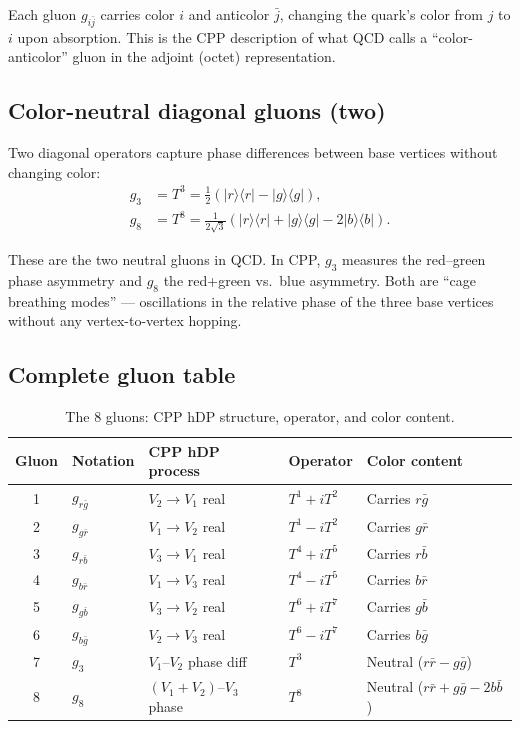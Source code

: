 \documentclass[11pt,a4paper]{article}
\newcommand{\ket}[1]{|#1\rangle}
\newcommand{\bra}[1]{\langle#1|}
\begin{document}
Each gluon $g_{i\bar{j}}$ carries color $i$ and anticolor $\bar{j}$,
changing the quark's color from $j$ to $i$ upon absorption.  This
is the CPP description of what QCD calls a ``color-anticolor'' gluon
in the adjoint (octet) representation.

\subsection{Color-neutral diagonal gluons (two)}

Two diagonal operators capture phase differences between base
vertices without changing color:
\begin{align}
g_3 &= T^3 = \frac{1}{2}(\ket{r}\!\bra{r} - \ket{g}\!\bra{g}),
\label{eq:g3} \\
g_8 &= T^8 = \frac{1}{2\sqrt{3}}
(\ket{r}\!\bra{r} + \ket{g}\!\bra{g} - 2\ket{b}\!\bra{b}).
\label{eq:g8}
\end{align}

These are the two neutral gluons in QCD.  In CPP, $g_3$ measures
the red--green phase asymmetry and $g_8$ the red+green vs.\ blue
asymmetry.  Both are ``cage breathing modes'' --- oscillations
in the relative phase of the three base vertices without any
vertex-to-vertex hopping.

\subsection{Complete gluon table}

\begin{table}[H]
\centering
\caption{The 8 gluons: CPP hDP structure, operator, and color content.}
\label{tab:gluons}
\begin{tabular}{@{}cllll@{}}
\toprule
Gluon & Notation & CPP hDP process & Operator & Color content \\
\midrule
1 & $g_{r\bar{g}}$ & $V_2 \to V_1$ real & $T^1 + iT^2$ & Carries $r\bar{g}$ \\
2 & $g_{g\bar{r}}$ & $V_1 \to V_2$ real & $T^1 - iT^2$ & Carries $g\bar{r}$ \\
3 & $g_{r\bar{b}}$ & $V_3 \to V_1$ real & $T^4 + iT^5$ & Carries $r\bar{b}$ \\
4 & $g_{b\bar{r}}$ & $V_1 \to V_3$ real & $T^4 - iT^5$ & Carries $b\bar{r}$ \\
5 & $g_{g\bar{b}}$ & $V_3 \to V_2$ real & $T^6 + iT^7$ & Carries $g\bar{b}$ \\
6 & $g_{b\bar{g}}$ & $V_2 \to V_3$ real & $T^6 - iT^7$ & Carries $b\bar{g}$ \\
7 & $g_3$ & $V_1$--$V_2$ phase diff & $T^3$ & Neutral ($r\bar{r} - g\bar{g}$) \\
8 & $g_8$ & $(V_1\!+\!V_2)$--$V_3$ phase & $T^8$ & Neutral ($r\bar{r}+g\bar{g}-2b\bar{b}$) \\
\bottomrule
\end{tabular}
\end{table}
\end{document}
